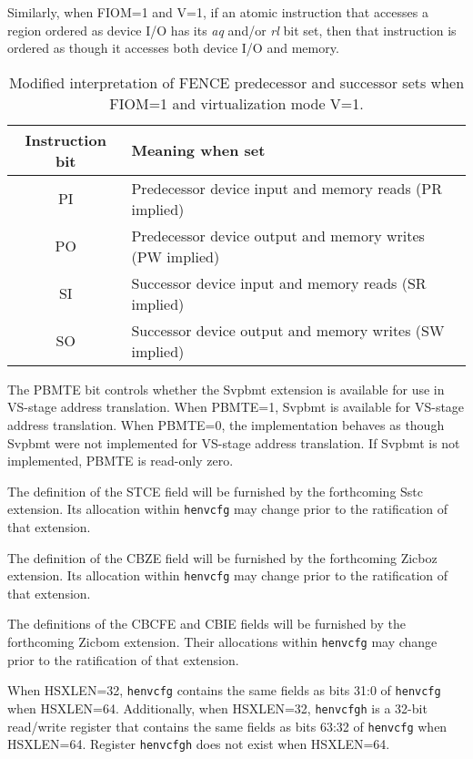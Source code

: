 Similarly, when FIOM=1 and V=1,
if an atomic instruction that accesses a region ordered as device I/O
has its {\em aq} and/or {\em rl} bit set, then that instruction is ordered
as though it accesses both device I/O and memory.

\begin{table}[h!]
\begin{center}
\begin{tabular}{|c|l|}
\hline
Instruction bit & Meaning when set \\
\hline
PI & Predecessor device input and memory reads   (PR implied) \\
PO & Predecessor device output and memory writes (PW implied) \\
\hline
SI & Successor device input and memory reads     (SR implied) \\
SO & Successor device output and memory writes   (SW implied) \\
\hline
\end{tabular}
\end{center}
\vspace{-0.1in}
\caption{%
Modified interpretation of FENCE predecessor and successor sets when
FIOM=1 and virtualization mode V=1.%
}
\label{tab:henvcfg-FIOM}
\end{table}

The PBMTE bit controls whether the Svpbmt extension is available for use in
VS-stage address translation.
When PBMTE=1, Svpbmt is available for VS-stage address translation.
When PBMTE=0, the implementation behaves as though Svpbmt were not implemented
for VS-stage address translation.
If Svpbmt is not implemented, PBMTE is read-only zero.

The definition of the STCE field will be furnished by the
forthcoming Sstc extension.
Its allocation within {\tt henvcfg} may change prior to the ratification
of that extension.

The definition of the CBZE field will be furnished by the
forthcoming Zicboz extension.
Its allocation within {\tt henvcfg} may change prior to the ratification
of that extension.

The definitions of the CBCFE and CBIE fields will be furnished by the
forthcoming Zicbom extension.
Their allocations within {\tt henvcfg} may change prior to the ratification
of that extension.

When HSXLEN=32, {\tt henvcfg} contains the same fields as bits 31:0
of {\tt henvcfg} when HSXLEN=64.
Additionally, when HSXLEN=32, {\tt henvcfgh} is a 32-bit read/write register that
contains the same fields as bits 63:32 of {\tt henvcfg} when
HSXLEN=64.
Register {\tt henvcfgh} does not exist when HSXLEN=64.

